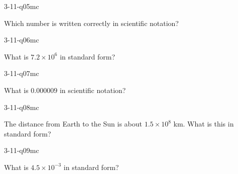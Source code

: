 \begin{practiceQuestion}{3-11-q05}{mc}
\begin{questionText}
Which number is written correctly in scientific notation?
\end{questionText}
\end{practiceQuestion}

\begin{practiceQuestion}{3-11-q06}{mc}
\begin{questionText}
What is $7.2 \times 10^6$ in standard form?
\end{questionText}
\end{practiceQuestion}

\begin{practiceQuestion}{3-11-q07}{mc}
\begin{questionText}
What is $0.000009$ in scientific notation?
\end{questionText}
\end{practiceQuestion}

\begin{practiceQuestion}{3-11-q08}{mc}
\begin{questionText}
The distance from Earth to the Sun is about $1.5 \times 10^8$ km. What is this in standard form?
\end{questionText}
\end{practiceQuestion}

\begin{practiceQuestion}{3-11-q09}{mc}
\begin{questionText}
What is $4.5 \times 10^{-3}$ in standard form?
\end{questionText}
\end{practiceQuestion}

